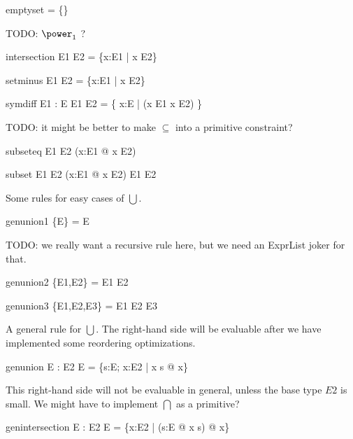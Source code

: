 \documentclass{article}
\begin{document}
\begin{zedrule}{emptyset}
   \emptyset = \{\}
\end{zedrule}

TODO: $\power_1$ ?

\begin{zedrule}{intersection}
   E1 \cap E2 = \{x:E1 | x \in E2\}
\end{zedrule}

\begin{zedrule}{setminus}
   E1 \setminus E2 = \{x:E1 | x \notin E2\}
\end{zedrule}

\begin{zedrule}{symdiff}
  \proviso E1 : \power E
\derives
   E1 \symdiff E2 = \{ x:E | \lnot (x \in E1 \iff x \in E2) \}
\end{zedrule}

TODO: it might be better to make $\subseteq$ into a primitive constraint?
\begin{zedrule}{subseteq}
   E1 \subseteq E2 \iff (\forall x:E1 @ x \in E2)
\end{zedrule}

\begin{zedrule}{subset}
   E1 \subset E2 \iff (\forall x:E1 @ x \in E2) \land E1 \neq E2
\end{zedrule}

Some rules for easy cases of $\bigcup$.
\begin{zedrule}{genunion1}
   \bigcup \{E\} = E
\end{zedrule}

TODO: we really want a recursive rule here,
but we need an ExprList joker for that.
\begin{zedrule}{genunion2}
   \bigcup \{E1,E2\} = E1 \cup E2
\end{zedrule}
\begin{zedrule}{genunion3}
   \bigcup \{E1,E2,E3\} = E1 \cup E2 \cup E3
\end{zedrule}

A general rule for $\bigcup$.
The right-hand side will be evaluable after we have implemented
some reordering optimizations. 
\begin{zedrule}{genunion}
   \proviso E : \power \power E2
\derives
   \bigcup E = \{s:E; x:E2 | x \in s @ x\}
\end{zedrule}

This right-hand side will not be evaluable in general,
unless the base type $E2$ is small.  We might have to
implement $\bigcap$ as a primitive?
\begin{zedrule}{genintersection}
   \proviso E : \power \power E2
\derives
   \bigcap E = \{x:E2 | (\forall s:E @ x \in s) @ x\}
\end{zedrule}
\end{document}
